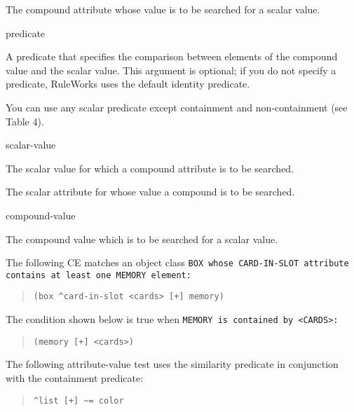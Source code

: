 \begin{operands}
\item[\ct{compound-attr}]

  The compound attribute whose value is to be searched for a scalar
  value.

\item[predicate]

  A predicate that specifies the comparison between elements of the
  compound value and the scalar value. This argument is optional; if
  you do not specify a predicate, RuleWorks uses the default identity
  predicate.

  You can use any scalar predicate except containment and
  non-containment (see Table 4).

\item[scalar-value]

  The scalar value for which a compound attribute is to be searched.

\item[\ct{scalar-attr}]

  The scalar attribute for whose value a compound is to be searched.

\item[compound-value]

  The compound value which is to be searched for a scalar value.
\end{operands}

\Example

The following CE matches an object class \tt{BOX} whose
\ct\tt{CARD-IN-SLOT} attribute contains at least one \tt{MEMORY} element:

\begin{quote}
\begin{verbatim}
(box ^card-in-slot <cards> [+] memory)
\end{verbatim}
\end{quote}

The condition shown below is true when \tt{MEMORY} is contained by
\tt{<CARDS>}:

\begin{quote}
\begin{verbatim}
(memory [+] <cards>)
\end{verbatim}
\end{quote}

The following attribute-value test uses the similarity
predicate in conjunction with the containment predicate:

\begin{quote}
\begin{verbatim}
^list [+] ~= color
\end{verbatim}
\end{quote}

